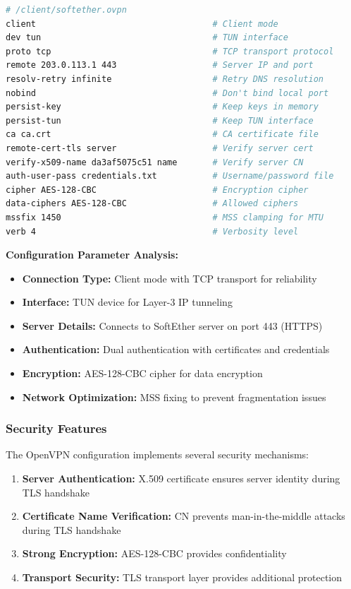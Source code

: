 \begin{lstlisting}[language=bash]
# /client/softether.ovpn
client                                   # Client mode
dev tun                                  # TUN interface
proto tcp                                # TCP transport protocol
remote 203.0.113.1 443                   # Server IP and port
resolv-retry infinite                    # Retry DNS resolution
nobind                                   # Don't bind local port
persist-key                              # Keep keys in memory
persist-tun                              # Keep TUN interface
ca ca.crt                                # CA certificate file
remote-cert-tls server                   # Verify server cert
verify-x509-name da3af5075c51 name       # Verify server CN
auth-user-pass credentials.txt           # Username/password file
cipher AES-128-CBC                       # Encryption cipher
data-ciphers AES-128-CBC                 # Allowed ciphers
mssfix 1450                              # MSS clamping for MTU
verb 4                                   # Verbosity level
\end{lstlisting}

\noindent
\textbf{Configuration Parameter Analysis:}

\begin{itemize}
    \item \textbf{Connection Type:} Client mode with TCP transport for reliability
    \item \textbf{Interface:} TUN device for Layer-3 IP tunneling
    \item \textbf{Server Details:} Connects to SoftEther server on port 443 (HTTPS)
    \item \textbf{Authentication:} Dual authentication with certificates and credentials
    \item \textbf{Encryption:} AES-128-CBC cipher for data encryption
    \item \textbf{Network Optimization:} MSS fixing to prevent fragmentation issues
\end{itemize}

\subsubsection{Security Features}

The OpenVPN configuration implements several security mechanisms:

\begin{enumerate}
    \item \textbf{Server Authentication:} X.509 certificate ensures server identity during TLS handshake
    \item \textbf{Certificate Name Verification:} CN prevents man-in-the-middle attacks during TLS handshake
    \item \textbf{Strong Encryption:} AES-128-CBC provides confidentiality
    \item \textbf{Transport Security:} TLS transport layer provides additional protection
\end{enumerate}

